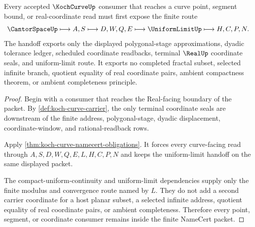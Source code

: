 \begin{theorem}
\label{thm:koch-curve-uniform-limit-handoff}
Every accepted $\KochCurveUp$ consumer that reaches a curve point, segment bound, or real-coordinate read must first expose the finite route
$$
\CantorSpaceUp \longmapsto A,S \longmapsto D,W,Q,E \longmapsto \UniformLimitUp \longmapsto H,C,P,N .
$$
The handoff exports only the displayed polygonal-stage approximations, dyadic tolerance ledger, scheduled coordinate readbacks, terminal $\RealUp$ coordinate seals, and uniform-limit route. It exports no completed fractal subset, selected infinite branch, quotient equality of real coordinate pairs, ambient compactness theorem, or ambient completeness principle.
\end{theorem}
\begin{proof}
Begin with a consumer that reaches the Real-facing boundary of the packet. By \autoref{def:koch-curve-carrier}, the only terminal coordinate seals are downstream of the finite address, polygonal-stage, dyadic displacement, coordinate-window, and rational-readback rows.

Apply \autoref{thm:koch-curve-namecert-obligations}. It forces every curve-facing read through $A,S,D,W,Q,E,L,H,C,P,N$ and keeps the uniform-limit handoff on the same displayed packet.

The compact-uniform-continuity and uniform-limit dependencies supply only the finite modulus and convergence route named by $L$. They do not add a second carrier coordinate for a host planar subset, a selected infinite address, quotient equality of real coordinate pairs, or ambient completeness. Therefore every point, segment, or coordinate consumer remains inside the finite NameCert packet.
\end{proof}



